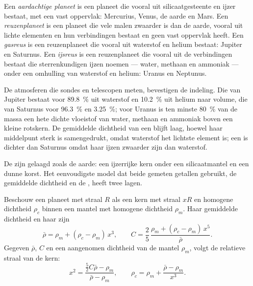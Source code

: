 \begin{definition}\label{def:b1:comparative-planetology:planet-types}
Een \emph{aardachtige planeet} is een planeet die vooral uit silicaatgesteente
en ijzer bestaat, met een vast oppervlak: Mercurius, Venus, de aarde en Mars. Een
\emph{reuzenplaneet} is een planeet die vele malen zwaarder is dan de aarde,
vooral uit lichte elementen en hun verbindingen bestaat en geen vast oppervlak heeft. Een
\emph{gasreus} is een reuzenplaneet die vooral uit waterstof en helium bestaat:
Jupiter en Saturnus. Een \emph{ijsreus} is een reuzenplaneet die vooral uit de
verbindingen bestaat die sterrenkundigen ijzen noemen --- water, methaan en ammoniak --- onder
een omhulling van waterstof en helium: Uranus en Neptunus.
\end{definition}

De atmosferen die sondes en telescopen meten, bevestigen de indeling. Die van Jupiter bestaat voor
\qty{89.8}{\percent} uit waterstof en \qty{10.2}{\percent} uit helium naar volume, die van Saturnus
voor \qty{96.3}{\percent} en \qty{3.25}{\percent}; voor Uranus is ten minste \qty{80}{\percent} van de
massa een hete dichte vloeistof van water, methaan en ammoniak boven een kleine rotskern. De gemiddelde
dichtheid van een  blijft laag, hoewel haar middelpunt sterk is samengedrukt, omdat waterstof het
lichtste element is; een  is dichter dan Saturnus omdat haar ijzen zwaarder zijn dan waterstof.

De  zijn gelaagd zoals de aarde: een ijzerrijke kern onder een silicaatmantel en
een dunne korst. Het eenvoudigste model dat beide gemeten getallen gebruikt, de gemiddelde dichtheid
en de , heeft twee lagen.

\begin{proposition}\label{prop:b1:comparative-planetology:two-layer}
Beschouw een planeet met straal $R$ als een kern met straal $xR$ en homogene dichtheid $\rho_c$
binnen een mantel met homogene dichtheid $\rho_m$. Haar gemiddelde dichtheid en haar
 zijn
\[
  \bar\rho = \rho_m + (\rho_c - \rho_m)\,x^3 , \qquad
  C = \frac25\,\frac{\rho_m + (\rho_c - \rho_m)\,x^5}{\bar\rho} .
\]
Gegeven $\bar\rho$, $C$ en een aangenomen dichtheid van de mantel $\rho_m$, volgt de relatieve
straal van de kern:
\[
  x^2 = \frac{\tfrac52C\bar\rho - \rho_m}{\bar\rho - \rho_m} ,
  \qquad \rho_c = \rho_m + \frac{\bar\rho - \rho_m}{x^3} .
\]
\end{proposition}

